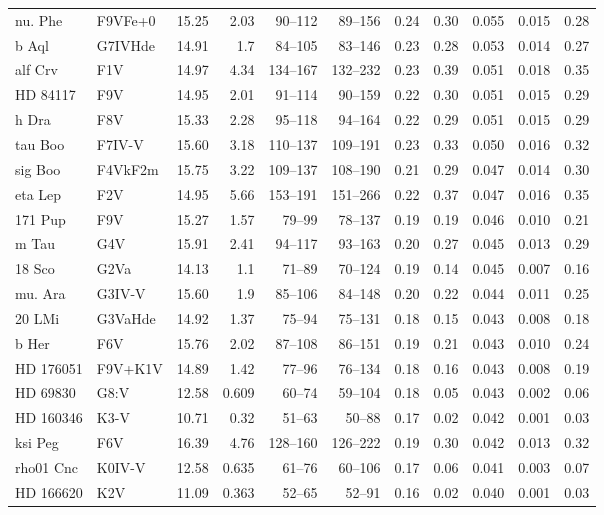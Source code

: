 \documentclass[11pt,a4paper]{article}
\begin{document}
{\begin{longtable}{llrrrrrrrrr}
nu. Phe & F9VFe+0 & 15.25 & 2.03 & 90--112 & 89--156 & 0.24 & 0.30 & 0.055 & 0.015 & 0.28 \\
b Aql & G7IVHde & 14.91 & 1.7 & 84--105 & 83--146 & 0.23 & 0.28 & 0.053 & 0.014 & 0.27 \\
alf Crv & F1V & 14.97 & 4.34 & 134--167 & 132--232 & 0.23 & 0.39 & 0.051 & 0.018 & 0.35 \\
HD  84117 & F9V & 14.95 & 2.01 & 91--114 & 90--159 & 0.22 & 0.30 & 0.051 & 0.015 & 0.29 \\
h Dra & F8V & 15.33 & 2.28 & 95--118 & 94--164 & 0.22 & 0.29 & 0.051 & 0.015 & 0.29 \\
tau Boo & F7IV-V & 15.60 & 3.18 & 110--137 & 109--191 & 0.23 & 0.33 & 0.050 & 0.016 & 0.32 \\
sig Boo & F4VkF2m & 15.75 & 3.22 & 109--137 & 108--190 & 0.21 & 0.29 & 0.047 & 0.014 & 0.30 \\
eta Lep & F2V & 14.95 & 5.66 & 153--191 & 151--266 & 0.22 & 0.37 & 0.047 & 0.016 & 0.35 \\
171 Pup & F9V & 15.27 & 1.57 & 79--99 & 78--137 & 0.19 & 0.19 & 0.046 & 0.010 & 0.21 \\
m Tau & G4V & 15.91 & 2.41 & 94--117 & 93--163 & 0.20 & 0.27 & 0.045 & 0.013 & 0.29 \\
18 Sco & G2Va & 14.13 & 1.1 & 71--89 & 70--124 & 0.19 & 0.14 & 0.045 & 0.007 & 0.16 \\
mu. Ara & G3IV-V & 15.60 & 1.9 & 85--106 & 84--148 & 0.20 & 0.22 & 0.044 & 0.011 & 0.25 \\
20 LMi & G3VaHde & 14.92 & 1.37 & 75--94 & 75--131 & 0.18 & 0.15 & 0.043 & 0.008 & 0.18 \\
b Her & F6V & 15.76 & 2.02 & 87--108 & 86--151 & 0.19 & 0.21 & 0.043 & 0.010 & 0.24 \\
HD 176051 & F9V+K1V & 14.89 & 1.42 & 77--96 & 76--134 & 0.18 & 0.16 & 0.043 & 0.008 & 0.19 \\
HD  69830 & G8:V & 12.58 & 0.609 & 60--74 & 59--104 & 0.18 & 0.05 & 0.043 & 0.002 & 0.06 \\
HD 160346 & K3-V & 10.71 & 0.32 & 51--63 & 50--88 & 0.17 & 0.02 & 0.042 & 0.001 & 0.03 \\
ksi Peg & F6V & 16.39 & 4.76 & 128--160 & 126--222 & 0.19 & 0.30 & 0.042 & 0.013 & 0.32 \\
rho01 Cnc & K0IV-V & 12.58 & 0.635 & 61--76 & 60--106 & 0.17 & 0.06 & 0.041 & 0.003 & 0.07 \\
HD 166620 & K2V & 11.09 & 0.363 & 52--65 & 52--91 & 0.16 & 0.02 & 0.040 & 0.001 & 0.03 \\

\end{longtable}}
\end{document}
